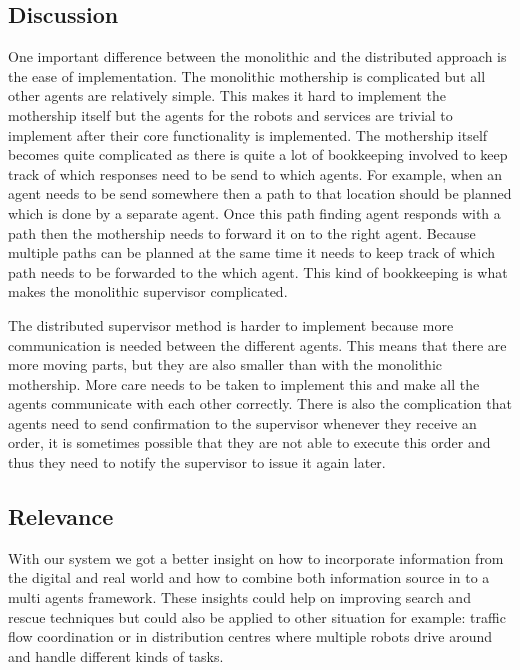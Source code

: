 \subsection{Discussion}

One important difference between the monolithic and the distributed approach is
the ease of implementation. The monolithic mothership is complicated but all
other agents are relatively simple. This makes it hard to implement the
mothership itself but the agents for the robots and services are trivial to
implement after their core functionality is implemented. The mothership itself
becomes quite complicated as there is quite a lot of bookkeeping involved to
keep track of which responses need to be send to which agents. For example,
when an agent needs to be send somewhere then a path to that location should
be planned which is done by a separate agent. Once this path finding agent
responds with a path then the mothership needs to forward it on to the right
agent. Because multiple paths can be planned at the same time it needs to keep
track of which path needs to be forwarded to the which agent. This kind of
bookkeeping is what makes the monolithic supervisor complicated.

The distributed supervisor method is harder to implement because more
communication is needed between the different agents. This means that there are
more moving parts, but they are also smaller than with the monolithic
mothership. More care needs to be taken to implement this and make all the
agents communicate with each other correctly. There is also the complication
that agents need to send confirmation to the supervisor whenever they receive
an order, it is sometimes possible that they are not able to execute this order
and thus they need to notify the supervisor to issue it again later.

\subsection{Relevance}

With our system we got a better insight on how to incorporate information from
the digital and real world and how to combine both information source in to a
multi agents framework. These insights could help on improving search and
rescue techniques but could also be applied to other situation for example:
traffic flow coordination or in distribution centres where multiple robots
drive around and handle different kinds of tasks.  

